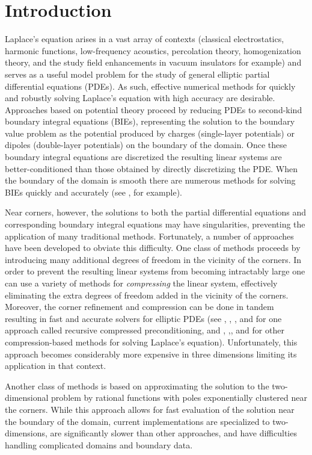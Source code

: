 \section{Introduction}
Laplace's equation arises in a vast array of contexts (classical electrostatics, harmonic functions, low-frequency acoustics, percolation theory, homogenization theory, and the study field enhancements in vacuum insulators for example) and serves as a useful model problem for the study of general elliptic partial differential equations (PDEs). As such, effective numerical methods for quickly and robustly solving Laplace's equation with high accuracy are desirable. Approaches based on potential theory proceed by reducing PDEs to second-kind boundary integral equations (BIEs), representing the solution to the boundary value problem as the potential produced by charges (single-layer potentials) or dipoles (double-layer potentials) on the boundary of the domain. Once these boundary integral equations are discretized the resulting linear systems are better-conditioned than those obtained by directly discretizing the PDE. When the boundary of the domain is smooth there are numerous methods for solving BIEs quickly and accurately (see \cite{hao}, for example). 

Near corners, however, the solutions to both the partial differential equations and corresponding boundary integral equations may have singularities, preventing the application of many traditional methods. Fortunately, a number of approaches have been developed to obviate this difficulty. One class of methods proceeds by introducing many additional degrees of freedom in the vicinity of the corners. In order to prevent the resulting linear systems from becoming intractably large one can use a variety of methods for {\it compressing} the linear system, effectively eliminating the extra degrees of freedom added in the vicinity of the corners. Moreover, the corner refinement and compression can be done in tandem resulting in fast and accurate solvers for elliptic PDEs (see \cite{helsing}, \cite{helsing2},  \cite{ojala}, \cite{helsjcp} and \cite{helsinv}  for  one approach called recursive compressed preconditioning, and  \cite{gillman}, \cite{bremer},\cite{bremer2}, and \cite{bremer3}  for other compression-based methods for solving Laplace's equation). Unfortunately, this approach becomes considerably more expensive in three dimensions limiting its application in that context.

 Another class of methods is based on approximating the solution to the two-dimensional problem by rational functions \cite{} with poles exponentially clustered near the corners. While this approach allows for fast evaluation of the solution near the boundary of the domain, current implementations are specialized to two-dimensions, are significantly slower than other approaches, and have difficulties handling complicated domains and boundary data.
 
